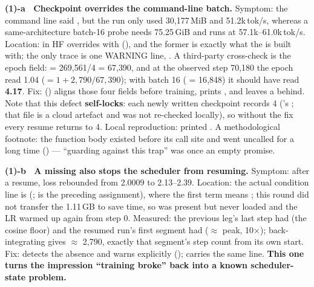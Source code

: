 \textbf{(1)-a \ Checkpoint overrides the command-line batch.} Symptom: the command line said
, but the run only used 30{,}177\,MiB and 51.2k\,tok/s, whereas a
same-architecture batch-16 probe needs 75.25\,GiB and runs at 57.1k--61.0k\,tok/s. Location: in
 HF overrides  with
 (), and the former is exactly what the
 is built with; the only trace is one WARNING line,
. A third-party
cross-check is the epoch field:  = 269{,}561/4 = 67{,}390, and at the
observed step 70{,}180 the epoch read 1.04 ($=1+2{,}790/67{,}390$); with batch 16
( = 16{,}848) it should have read \textbf{4.17}. Fix:
 () aligns those four fields before
training, prints , and leaves a  behind. Note that
this defect \textbf{self-locks}: each newly written checkpoint records 4
('s ; that file is a cloud
artefact and was not re-checked locally), so without the fix every resume returns to 4. Local
reproduction:  printed .
A methodological footnote: the function body existed before its call site and went uncalled for a
long time () --- ``guarding against this trap'' was once an empty promise.

\textbf{(1)-b \ A missing  also stops the scheduler from resuming.} Symptom:
after a resume, loss rebounded from 2.0009 to 2.13--2.39. Location: the actual condition line is
(;  is the preceding assignment), where the first term means
; this round did not transfer the 1.11\,GB  to save time, so
 was present but never loaded and the LR warmed up again from step 0. Measured:
the previous leg's last step had  (the cosine floor) and the
resumed run's first segment had  ($\approx$ peak, 10$\times$); back-integrating
gives  $\approx$ 2{,}790, exactly that segment's step count from its own start.
Fix:  detects the absence and warns explicitly
();  carries the same line. \textbf{This one turns
the impression ``training broke'' back into a known scheduler-state problem.}

